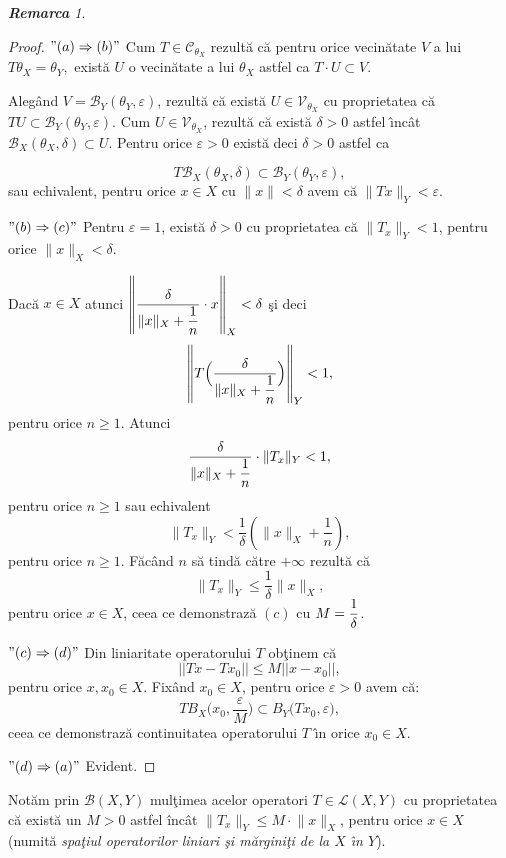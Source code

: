 \documentclass[ a4paper, 12pt]{report}
\theoremstyle{definition}
\theoremstyle{remark}
\newtheorem{remarc}{\bf Remarca}[section]
\numberwithin{equation}{section}
\begin{document}
\begin{remarc}
\begin{proof}
$"(a) \Rightarrow  (b)"$ Cum $T \in \mathcal{C}_{\theta_{X}}$ rezult\u a c\u a pentru orice vecin\u atate $V$ a lui $T{\theta_{X}} = \theta_{Y},$ exist\u a $U$ o vecin\u atate a lui $\theta_{X}$ astfel ca $T \cdot U \subset V.$

Aleg\^and $ V = \mathcal{B}_{Y}(\theta_{Y}, \varepsilon)$, rezult\u a c\u a exist\u a  $U \in \mathcal{V}_{\theta_{X}}$ cu proprietatea c\u a $T U \subset \mathcal{B}_{Y}(\theta_{Y}, \varepsilon)$. Cum $U \in \mathcal{V}_{\theta_{X}}$, rezult\u a c\u a exist\u a  $\delta>0$ astfel \^\i nc\^ at $\mathcal{B}_{X}(\theta_{X}, \delta) \subset U$. Pentru orice $\varepsilon > 0$ exist\u a deci $\delta > 0$ astfel ca

$$T  \mathcal{B}_{X}(\theta_{X}, \delta) \subset \mathcal{B}_{Y}(\theta_{Y}, \varepsilon),$$ sau echivalent, pentru orice $x \in X$ cu $\lVert x \rVert < \delta$ avem c\u a $\lVert Tx \rVert_{Y}< \varepsilon.$

$"(b) \Rightarrow (c)"$
Pentru $\varepsilon =1$, exist\u a $\delta > 0$ cu proprietatea c\u a $\lVert T_x \rVert_{Y}<1$, pentru orice $\lVert x \rVert_{X} < \delta.$

Dac\u a $x \in X$ atunci $\left\lVert \displaystyle\frac{\delta}{\lVert x \rVert_{X}+\displaystyle\frac{1}{n}}\cdot x \right\rVert_{X} < \delta$ \c si deci
$$\left\lVert T \Big(  \displaystyle\frac{\delta}{\lVert x \rVert_{X}+\displaystyle\frac{1}{n}} \Big) \right\rVert_{Y} < 1,$$ pentru orice $n \geq 1$. Atunci
$$\displaystyle\frac{\delta}{\lVert x \rVert_{X}+\displaystyle\frac{1}{n}} \cdot \lVert T_x \rVert_{Y} < 1,$$ pentru orice $n \geq 1$ sau echivalent
$$\lVert T_x \rVert_{Y} < \frac{1}{\delta} \left( \lVert x \rVert_{X} + \frac{1}{n} \right),$$ pentru orice $n \geq 1$.  F\u ac\^ and $n$ s\u a tind\u a c\u atre $+ \infty$ rezult\u a c\u a
$$\lVert T_x \rVert_{Y} \leq \frac{1}{\delta}   \lVert x \rVert_{X},$$ pentru orice  $x \in X$, ceea ce demonstraz\u a $(c)$ cu $M = \displaystyle\frac{1}{\delta}$.

$"(c) \Rightarrow (d)"$ Din liniaritate operatorului $T$ ob\c tinem c\u a
$$||Tx - Tx_0|| \leq M ||x - x_0||,$$ pentru orice $x, x_0 \in X$. Fix\^ and $x_0 \in X$, pentru orice $\varepsilon > 0$ avem c\u a:
$$T B_X\big(x_0, \frac{\varepsilon}{M}\big) \subset B_Y\big( Tx_0, \varepsilon\big),$$ ceea ce demonstraz\u a  continuitatea operatorului $T$ \^\i n orice $x_0 \in X$.

$"(d)\Rightarrow  (a)"$ Evident.
\end{proof}

\end{remarc}
Not\u am prin $\mathcal{B}(X,Y)$ mul\c timea acelor operatori $T \in \mathcal{L}(X,Y)$ cu proprietatea c\u a  exist\u a  un $M>0$ astfel \^inc\^at $\lVert T_x \rVert_{Y} \leq M \cdot \lVert x \rVert_{X}$, pentru orice $x \in X$ (numit\u a {\it spa\c tiul operatorilor liniari \c si m\u argini\c ti de la $X$ \^\i n $Y$}).
\end{document}
